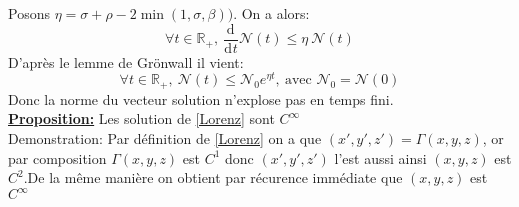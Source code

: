 \documentclass{article}
\newcommand{\R}{\mathbb{R}}
\newcommand{\deriv}[3][ ]{
    \ensuremath{\frac{\mathrm{d}^{#1}#2}{\mathrm{d}^{#1} #3}}
}
\begin{document}
Posons $ \eta = \sigma + \rho - 2 \min (1,\sigma,\beta))$. On a alors: 
\[
    \forall t \in \R_+, \  \deriv{}{t}\mathcal{N}(t) \le \eta\  \mathcal{N}(t)
\]
D'après le lemme de Grönwall il vient:
\[
    \forall t \in \R_+,\  \mathcal{N}(t) \le \mathcal{N}_0 e^{\eta t},\  \textrm{avec } \mathcal{N}_0 = \mathcal{N}(0)
\]
Donc la norme du vecteur solution n'explose pas en temps fini.\\

\underline{\textbf{Proposition:}} Les solution de \eqref{Lorenz} sont $C^\infty$\\

Demonstration:
 Par définition de \eqref{Lorenz} on a que $(x',y',z') = \Gamma(x,y,z)$, or par composition $\Gamma(x,y,z)$ est $C^1$ donc $(x',y',z')$ l'est aussi ainsi $(x,y,z)$ est $C^2$.De la même manière on obtient par récurence immédiate que $(x,y,z)$ est $C^\infty$\\
\end{document}

